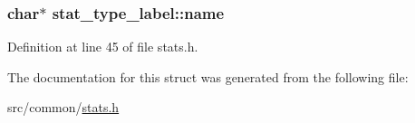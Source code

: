 \hypertarget{structstat__type__label_a4dc872fb0d9d5fb81f1931319d4b1eff}{
\subsubsection[{name}]{\setlength{\rightskip}{0pt plus 5cm}char$\ast$ stat\-\_\-type\-\_\-label\-::name}}\label{structstat__type__label_a4dc872fb0d9d5fb81f1931319d4b1eff}


Definition at line 45 of file stats.\-h.



The documentation for this struct was generated from the following file\-:\begin{DoxyCompactItemize}
\item 
src/common/\hyperlink{stats_8h}{stats.\-h}\end{DoxyCompactItemize}
